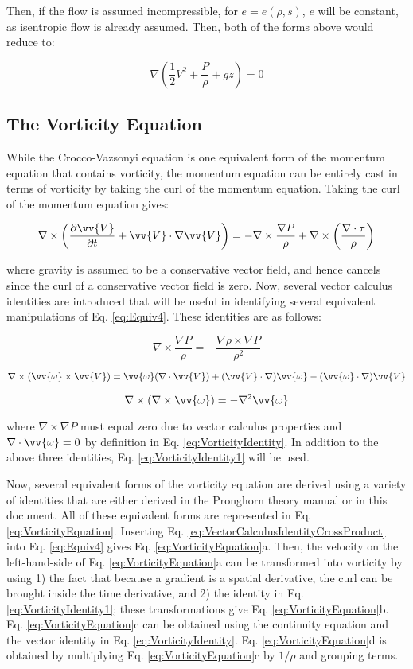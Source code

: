 \documentclass[10pt]{article}
\newcommand{\beq}{\begin{equation}}
\newcommand{\eeq}{\end{equation}}
\begin{document}
\begin{flushleft}
Then, if the flow is assumed incompressible, for \(e=e(\rho,s)\), \(e\) will be constant, as isentropic flow is already assumed. Then, both of the forms above would reduce to:

\beq
\label{eq:Bernoulli3}
\nabla\left(\frac{1}{2}V^2+\frac{P}{\rho}+gz\right)=0
\eeq

\subsection{The Vorticity Equation}

While the Crocco-Vazsonyi equation is one equivalent form of the momentum equation that contains vorticity, the momentum equation can be entirely cast in terms of vorticity by taking the curl of the momentum equation. Taking the curl of the momentum equation gives:

\beq
\label{eq:Equiv4}
\nabla\times\left(\frac{\partial \vv{V}}{\partial t}+\vv{V}\cdot\nabla\vv{V}\right)=-\nabla\times\frac{\nabla P}{\rho}+\nabla\times\left(\frac{\nabla\cdot\tau}{\rho}\right)
\eeq

where gravity is assumed to be a conservative vector field, and hence cancels since the curl of a conservative vector field is zero. Now, several vector calculus identities are introduced that will be useful in identifying several equivalent manipulations of Eq. \eqref{eq:Equiv4}. These identities are as follows:

\beq
\label{eq:VectorCalculusIdentityCrossProduct}
\nabla\times\frac{\nabla P}{\rho}=-\frac{\nabla\rho\times\nabla P}{\rho^2}
\eeq

\beq
\label{eq:VorticityIdentity}
\nabla\times(\vv{\omega}\times\vv{V})=\vv{\omega}(\nabla\cdot\vv{V})+(\vv{V}\cdot\nabla)\vv{\omega}-(\vv{\omega}\cdot\nabla)\vv{V}
\eeq

\beq
\nabla\times(\nabla\times\vv{\omega})=-\nabla^2\vv{\omega}
\eeq

where \(\nabla\times\nabla P\) must equal zero due to vector calculus properties and \(\nabla\cdot\vv{\omega}=0\) by definition in Eq. \eqref{eq:VorticityIdentity}. In addition to the above three identities, Eq. \eqref{eq:VorticityIdentity1} will be used. 

Now, several equivalent forms of the vorticity equation are derived using a variety of identities that are either derived in the Pronghorn theory manual or in this document. All of these equivalent forms are represented in Eq. \eqref{eq:VorticityEquation}. Inserting Eq. \eqref{eq:VectorCalculusIdentityCrossProduct} into Eq. \eqref{eq:Equiv4} gives Eq. \eqref{eq:VorticityEquation}a. Then, the velocity on the left-hand-side of Eq. \eqref{eq:VorticityEquation}a can be transformed into vorticity by using 1) the fact that because a gradient is a spatial derivative, the curl can be brought inside the time derivative, and 2) the identity in Eq. \eqref{eq:VorticityIdentity1}; these transformations give Eq. \eqref{eq:VorticityEquation}b. Eq. \eqref{eq:VorticityEquation}c can be obtained using the continuity equation and the vector identity in Eq. \eqref{eq:VorticityIdentity}. Eq. \eqref{eq:VorticityEquation}d is obtained by multiplying Eq. \eqref{eq:VorticityEquation}c by \(1/\rho\) and grouping terms.


\end{flushleft}
\end{document}
